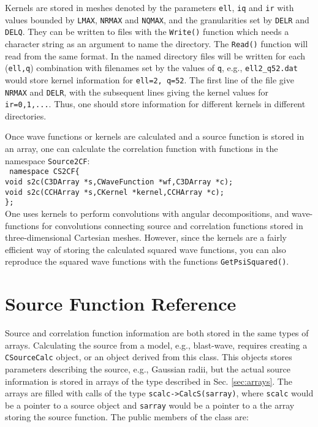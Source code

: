 \documentclass[10pt]{article}
\def\tab{\hspace*{9pt}}
\begin{document}
Kernels are stored in meshes denoted by the parameters {\tt ell}, {\tt iq} and {\tt ir} with values bounded by {\tt LMAX}, {\tt NRMAX} and {\tt NQMAX}, and the granularities set by {\tt DELR} and {\tt DELQ}. They can be written to files with the {\tt Write()} function which needs a character string as an argument to name the directory. The {\tt Read()} function will read from the same format. In the named directory files will be written for each ({\tt ell,q}) combination with filenames set by the values of {\tt q}, e.g., {\tt ell2\_q52.dat} would store kernel information for {\tt ell=2, q=52}. The first line of the file give {\tt NRMAX} and {\tt DELR}, with the subsequent lines giving the kernel values for {\tt ir=0,1,...}. Thus, one should store information for different kernels in different directories.

Once wave functions or kernels are calculated and a source function is stored in an array, one can calculate the correlation function with functions in the namespace {\tt Source2CF}:\\
{\tt
namespace CS2CF\{\\
\tab void s2c(C3DArray *s,CWaveFunction *wf,C3DArray *c);\\
\tab void s2c(CCHArray *s,CKernel *kernel,CCHArray *c);\\
\};}\\
One uses kernels to perform convolutions with angular decompositions, and wave-functions for convolutions connecting source and correlation functions stored in three-dimensional Cartesian meshes. However, since the kernels are a fairly efficient way of storing the calculated squared wave functions, you can also reproduce the squared wave functions with the functions {\tt GetPsiSquared()}.

\section{Source Function Reference}

Source and correlation function information are both stored in the same types of arrays. Calculating the source from a model, e.g., blast-wave, requires creating a {\tt CSourceCalc} object, or an object derived from this class. This objects stores parameters describing the source, e.g., Gaussian radii, but the actual source information is stored in arrays of the type described in Sec. \ref{sec:arrays}. The arrays are filled with calls of the type {\tt scalc->CalcS(sarray)}, where {\tt scalc} would be a pointer to a source object and {\tt sarray} would be a pointer to a the array storing the source function. The public members of the class are:
\end{document}
